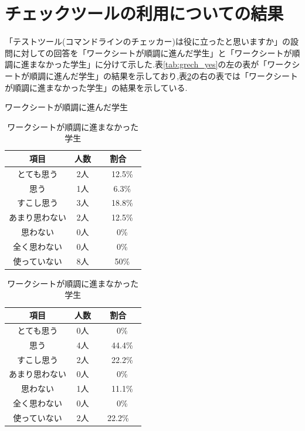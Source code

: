 \documentclass[11pt, a4paper]{jreport}
\begin{document}
\section{チェックツールの利用についての結果}

「テストツール(コマンドラインのチェッカー)は役に立ったと思いますか」の設問に対しての回答を「ワークシートが順調に進んだ学生」と「ワークシートが順調に進まなかった学生」に分けて示した.表\ref{tab:grech_yes}の左の表が「ワークシートが順調に進んだ学生」の結果を示しており,表\ref{tab:grech_no}の右の表では「ワークシートが順調に進まなかった学生」の結果を示している.

\begin{table}[htbp]
  \begin{minipage}[c]{0.5\hsize}
        \caption{ワークシートが順調に進んだ学生}
        \label{tab:grech_yes}
        \centering
        \begin{tabular}{|c|c|c|} \hline
        項目 & 人数 & 割合\\ \hline
        とても思う & 2人 &　12.5\%　\\ \hline
        思う & 1人 &　6.3\%　\\ \hline
        すこし思う & 3人 &　18.8\%　\\ \hline
        あまり思わない & 2人 &　12.5\%　\\ \hline
        思わない & 0人 &　0\%　\\ \hline
        全く思わない & 0人 &　0\%　\\ \hline
        使っていない & 8人 &　50\%　\\ \hline
        \end{tabular}
    \end{minipage}
    \begin{minipage}[c]{0.5\hsize}
        \caption{ワークシートが順調に進まなかった学生}
        \label{tab:grech_no}
        \centering
        \begin{tabular}{|c|c|c|} \hline
        項目 & 人数 & 割合\\ \hline
        とても思う & 0人 &　0\%　\\ \hline
        思う & 4人 &　44.4\%　\\ \hline
        すこし思う & 2人 &　22.2\%　\\ \hline
        あまり思わない & 0人 &　0\%　\\ \hline
        思わない & 1人 &　11.1\%　\\ \hline
        全く思わない & 0人 &　0\%　\\ \hline
        使っていない & 2人 & 22.2\%　\\ \hline
    \end{tabular}
  \end{minipage}
\end{table}
\end{document}
